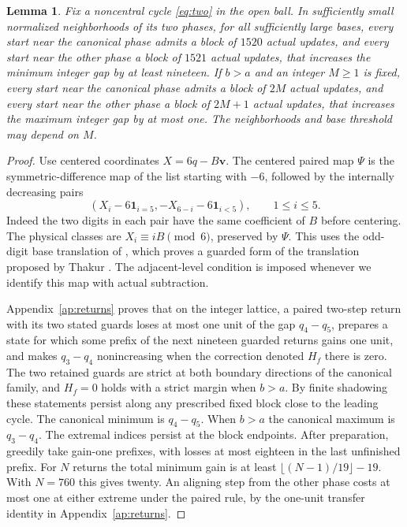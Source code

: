 \documentclass[11pt,reqno]{amsart}
\newtheorem{lemma}[theorem]{Lemma}
\theoremstyle{remark}
\newcommand{\vct}{\boldsymbol v}
\begin{document}
\begin{lemma}\label{lem:two}
Fix a noncentral cycle \eqref{eq:two} in the open ball. In sufficiently small normalized neighborhoods of its two phases, for all sufficiently large bases, every start near the canonical phase admits a block of \(1520\) actual updates, and every start near the other phase a block of \(1521\) actual updates, that increases the minimum integer gap by at least nineteen. If \(b>a\) and an integer \(M\ge1\) is fixed, every start near the canonical phase admits a block of \(2M\) actual updates, and every start near the other phase a block of \(2M+1\) actual updates, that increases the maximum integer gap by at most one. The neighborhoods and base threshold may depend on \(M\).
\end{lemma}
\begin{proof}
Use centered coordinates \(X=6q-B\vct\). The centered paired map \(\Psi\) is the symmetric-difference map of the list starting with \(-6\), followed by the internally decreasing pairs
\begin{equation}\label{eq:centered}
 (X_i-6\mathbf1_{i=5},-X_{6-i}-6\mathbf1_{i<5}),\qquad 1\le i\le5 .
\end{equation}
Indeed the two digits in each pair have the same coefficient of \(B\) before centering. The physical classes are \(X_i\equiv iB\pmod6\), preserved by \(\Psi\). This uses the odd-digit base translation of \cite[Theorem 4]{G4}, which proves a guarded form of the translation proposed by Thakur \cite[Remark 4.3]{Thakur}. The adjacent-level condition is imposed whenever we identify this map with actual subtraction.

Appendix~\ref{ap:returns} proves that on the integer lattice, a paired two-step return with its two stated guards loses at most one unit of the gap \(q_4-q_5\), prepares a state for which some prefix of the next nineteen guarded returns gains one unit, and makes \(q_3-q_4\) nonincreasing when the correction denoted \(H_f\) there is zero. The two retained guards are strict at both boundary directions of the canonical family, and \(H_f=0\) holds with a strict margin when \(b>a\). By finite shadowing these statements persist along any prescribed fixed block close to the leading cycle. The canonical minimum is \(q_4-q_5\). When \(b>a\) the canonical maximum is \(q_3-q_4\). The extremal indices persist at the block endpoints. After preparation, greedily take gain-one prefixes, with losses at most eighteen in the last unfinished prefix. For \(N\) returns the total minimum gain is at least \(\lfloor(N-1)/19\rfloor-19\). With \(N=760\) this gives twenty. An aligning step from the other phase costs at most one at either extreme under the paired rule, by the one-unit transfer identity in Appendix~\ref{ap:returns}.


\end{proof}
\end{document}
